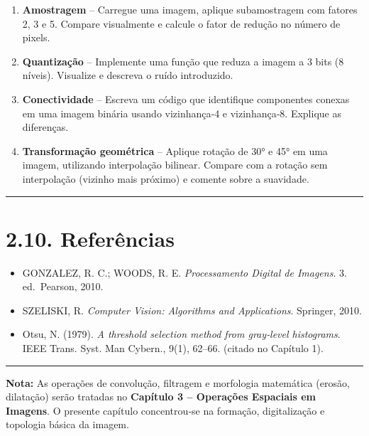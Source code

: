 \documentclass[
  portuguese,
  letterpaper,
  openany,
  oneside,
  12pt,
  a4paper]{book}
\providecommand{\tightlist}{%
  \setlength{\itemsep}{0pt}\setlength{\parskip}{0pt}}
\begin{document}
\begin{tcolorbox}
\begin{enumerate}
\def\labelenumi{\arabic{enumi}.}
\tightlist
\item
  \textbf{Amostragem} -- Carregue uma imagem, aplique subamostragem com
  fatores 2, 3 e 5. Compare visualmente e calcule o fator de redução no
  número de pixels.
\item
  \textbf{Quantização} -- Implemente uma função que reduza a imagem a 3
  bits (8 níveis). Visualize e descreva o ruído introduzido.
\item
  \textbf{Conectividade} -- Escreva um código que identifique
  componentes conexas em uma imagem binária usando vizinhança‑4 e
  vizinhança‑8. Explique as diferenças.
\item
  \textbf{Transformação geométrica} -- Aplique rotação de 30° e 45° em
  uma imagem, utilizando interpolação bilinear. Compare com a rotação
  sem interpolação (vizinho mais próximo) e comente sobre a suavidade.
\end{enumerate}

\begin{center}\rule{0.5\linewidth}{0.5pt}\end{center}

\section{2.10. Referências}\label{referuxeancias}

\begin{itemize}
\tightlist
\item
  GONZALEZ, R. C.; WOODS, R. E. \emph{Processamento Digital de Imagens}.
  3. ed.~Pearson, 2010.
\item
  SZELISKI, R. \emph{Computer Vision: Algorithms and Applications}.
  Springer, 2010.
\item
  Otsu, N. (1979). \emph{A threshold selection method from gray‑level
  histograms}. IEEE Trans. Syst. Man Cybern., 9(1), 62--66. (citado no
  Capítulo 1).
\end{itemize}

\begin{center}\rule{0.5\linewidth}{0.5pt}\end{center}

\textbf{Nota:} As operações de convolução, filtragem e morfologia
matemática (erosão, dilatação) serão tratadas no \textbf{Capítulo 3 --
Operações Espaciais em Imagens}. O presente capítulo concentrou‑se na
formação, digitalização e topologia básica da imagem.


\end{tcolorbox}
\end{document}
